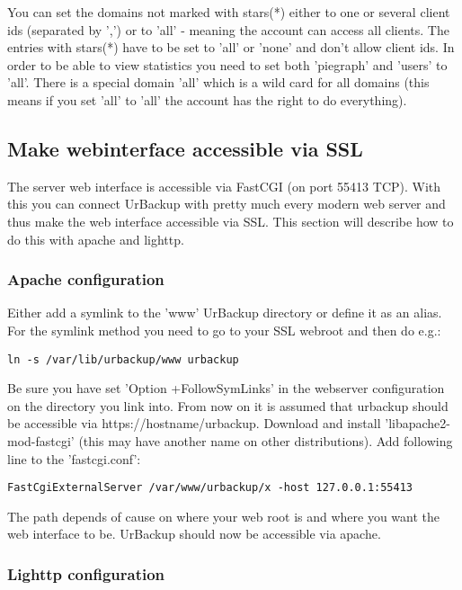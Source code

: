 \documentclass[a4paper,10pt]{article} \usepackage[breaklinks=true]{hyperref}
\begin{document}
You can set the domains not marked with stars(*) either to one or several client ids (separated by ',') or to 'all' - meaning the account can access all clients. The entries with stars(*) have to be set to 'all' or 'none' and don't allow client ids. In order to be able to view statistics you need to set both 'piegraph' and 'users' to 'all'. There is a special domain 'all' which is a wild card for all domains (this means if you set 'all' to 'all' the account has the right to do everything). 

\subsection{Make webinterface accessible via SSL}
\label{sec_webinterface_ssl}

The server web interface is accessible via FastCGI (on port 55413 TCP). With this you can connect UrBackup with pretty much every modern web server and thus make the web interface accessible via SSL. This section will describe how to do this with apache and lighttp.

\subsubsection{Apache configuration}
\label{subsub_apache}

Either add a symlink to the 'www' UrBackup directory or define it as an alias. For the symlink method you need to go to your SSL webroot and then do e.g.:
\begin{verbatim}
ln -s /var/lib/urbackup/www urbackup
\end{verbatim}
Be sure you have set 'Option +FollowSymLinks' in the webserver configuration on the directory you link into. From now on it is assumed that urbackup should be accessible via https://hostname/urbackup.
Download and install 'libapache2-mod-fastcgi' (this may have another name on other distributions). Add following line to the 'fastcgi.conf':
\begin{verbatim}
FastCgiExternalServer /var/www/urbackup/x -host 127.0.0.1:55413
\end{verbatim}
The path depends of cause on where your web root is and where you want the web interface to be. UrBackup should now be accessible via apache.

\subsubsection{Lighttp configuration}
\end{document}
